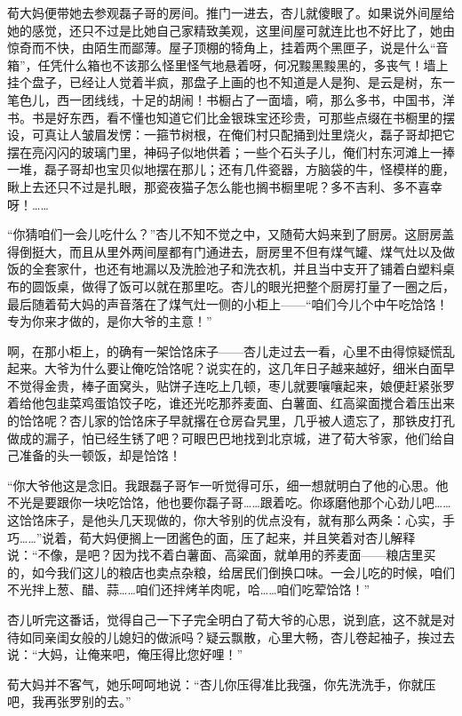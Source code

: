 \par 荀大妈便带她去参观磊子哥的房间。推门一进去，杏儿就傻眼了。如果说外间屋给她的感觉，还只不过是比她自己家精致美观，这里间屋可就连比也不好比了，她由惊奇而不快，由陌生而鄙薄。屋子顶棚的犄角上，挂着两个黑匣子，说是什么“音箱”，任凭什么箱也不该那么怪里怪气地悬着呀，何况黢黑黢黑的，多丧气！墙上挂个盘子，已经让人觉着半疯，那盘子上画的也不知道是人是狗、是云是树，东一笔色儿，西一团线线，十足的胡闹！书橱占了一面墙，嗬，那么多书，中国书，洋书。书是好东西，看不懂也知道它们比金银珠宝还珍贵，可那些点缀在书橱里的摆设，可真让人皱眉发愣：一箍节树根，在俺们村只配捅到灶里烧火，磊子哥却把它摆在亮闪闪的玻璃门里，神码子似地供着；一些个石头子儿，俺们村东河滩上一捧一堆，磊子哥却也宝贝似地摆在那儿；还有几件瓷器，方脑袋的牛，怪模样的鹿，瞅上去还只不过是扎眼，那瓷夜猫子怎么能也搁书橱里呢？多不吉利、多不喜幸呀！……
\par “你猜咱们一会儿吃什么？”杏儿不知不觉之中，又随荀大妈来到了厨房。这厨房盖得倒挺大，而且从里外两间屋都有门通进去，厨房里不但有煤气罐、煤气灶以及做饭的全套家什，也还有地漏以及洗脸池子和洗衣机，并且当中支开了铺着白塑料桌布的圆饭桌，做得了饭可以就在那里吃。杏儿的眼光把整个厨房打量了一圈之后，最后随着荀大妈的声音落在了煤气灶一侧的小柜上——“咱们今儿个中午吃饸饹！专为你来才做的，是你大爷的主意！”
\par 啊，在那小柜上，的确有一架饸饹床子——杏儿走过去一看，心里不由得惊疑慌乱起来。大爷为什么要让俺吃饸饹呢？说实在的，这几年日子越来越好，细米白面早不觉得金贵，棒子面窝头，贴饼子连吃上几顿，枣儿就要嚷嚷起来，娘便赶紧张罗着给他包韭菜鸡蛋馅饺子吃，谁还光吃那荞麦面、白薯面、红高粱面搅合着压出来的饸饹呢？杏儿家的饸饹床子早就撂在仓房旮旯里，几乎被人遗忘了，那铁皮打孔做成的漏子，怕已经生锈了吧？可眼巴巴地找到北京城，进了荀大爷家，他们给自己准备的头一顿饭，却是饸饹！
\par “你大爷他这是念旧。我跟磊子哥乍一听觉得可乐，细一想就明白了他的心思。他不光是要跟你一块吃饸饹，他也要你磊子哥……跟着吃。你琢磨他那个心劲儿吧……这饸饹床子，是他头几天现做的，你大爷别的优点没有，就有那么两条：心实，手巧……”说着，荀大妈便搁上一团酱色的面，压了起来，并且笑着对杏儿解释说：“不像，是吧？因为找不着白薯面、高粱面，就单用的荞麦面——粮店里买的，如今我们这儿的粮店也卖点杂粮，给居民们倒换口味。一会儿吃的时候，咱们不光拌上葱、醋、蒜……咱们还拌烤羊肉呢，哈……咱们吃荤饸饹！”
\par 杏儿听完这番话，觉得自己一下子完全明白了荀大爷的心思，说到底，这不就是对待如同亲闺女般的儿媳妇的做派吗？疑云飘散，心里大畅，杏儿卷起袖子，挨过去说：“大妈，让俺来吧，俺压得比您好哩！”
\par 荀大妈并不客气，她乐呵呵地说：“杏儿你压得准比我强，你先洗洗手，你就压吧，我再张罗别的去。”
